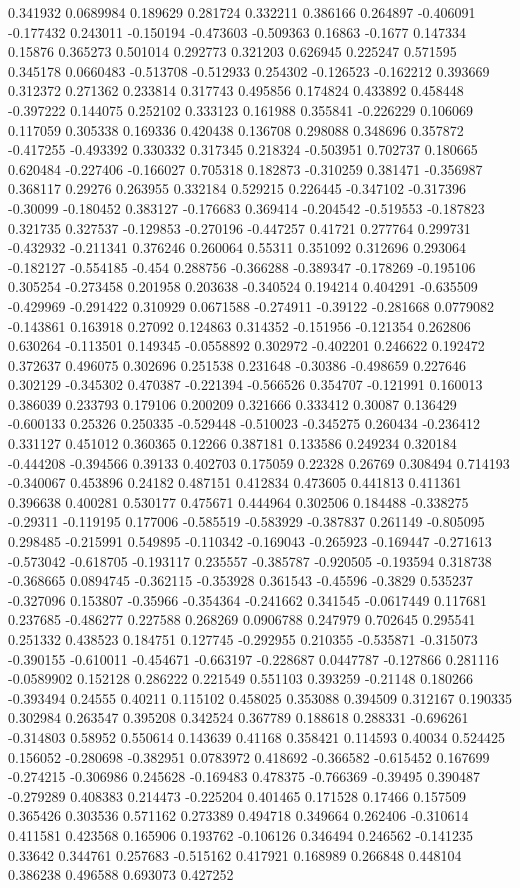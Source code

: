 0.341932 0.0689984 0.189629 0.281724 0.332211 0.386166 0.264897 -0.406091 -0.177432 0.243011 -0.150194 -0.473603 -0.509363 0.16863 -0.1677 0.147334 0.15876 0.365273 0.501014 0.292773 0.321203 0.626945 0.225247 0.571595 0.345178 0.0660483 -0.513708 -0.512933 0.254302 -0.126523 -0.162212 0.393669 0.312372 0.271362 0.233814 0.317743 0.495856 0.174824 0.433892 0.458448 -0.397222 0.144075 0.252102 0.333123 0.161988 0.355841 -0.226229 0.106069 0.117059 0.305338 0.169336 0.420438 0.136708 0.298088 0.348696 0.357872 -0.417255 -0.493392 0.330332 0.317345 0.218324 -0.503951 0.702737 0.180665 0.620484 -0.227406 -0.166027 0.705318 0.182873 -0.310259 0.381471 -0.356987 0.368117 0.29276 0.263955 0.332184 0.529215 0.226445 -0.347102 -0.317396 -0.30099 -0.180452 0.383127 -0.176683 0.369414 -0.204542 -0.519553 -0.187823 0.321735 0.327537 -0.129853 -0.270196 -0.447257 0.41721 0.277764 0.299731 -0.432932 -0.211341 0.376246 0.260064 0.55311 0.351092 0.312696 0.293064 -0.182127 -0.554185 -0.454 0.288756 -0.366288 -0.389347 -0.178269 -0.195106 0.305254 -0.273458 0.201958 0.203638 -0.340524 0.194214 0.404291 -0.635509 -0.429969 -0.291422 0.310929 0.0671588 -0.274911 -0.39122 -0.281668 0.0779082 -0.143861 0.163918 0.27092 0.124863 0.314352 -0.151956 -0.121354 0.262806 0.630264 -0.113501 0.149345 -0.0558892 0.302972 -0.402201 0.246622 0.192472 0.372637 0.496075 0.302696 0.251538 0.231648 -0.30386 -0.498659 0.227646 0.302129 -0.345302 0.470387 -0.221394 -0.566526 0.354707 -0.121991 0.160013 0.386039 0.233793 0.179106 0.200209 0.321666 0.333412 0.30087 0.136429 -0.600133 0.25326 0.250335 -0.529448 -0.510023 -0.345275 0.260434 -0.236412 0.331127 0.451012 0.360365 0.12266 0.387181 0.133586 0.249234 0.320184 -0.444208 -0.394566 0.39133 0.402703 0.175059 0.22328 0.26769 0.308494 0.714193 -0.340067 0.453896 0.24182 0.487151 0.412834 0.473605 0.441813 0.411361 0.396638 0.400281 0.530177 0.475671 0.444964 0.302506 0.184488 -0.338275 -0.29311 -0.119195 0.177006 -0.585519 -0.583929 -0.387837 0.261149 -0.805095 0.298485 -0.215991 0.549895 -0.110342 -0.169043 -0.265923 -0.169447 -0.271613 -0.573042 -0.618705 -0.193117 0.235557 -0.385787 -0.920505 -0.193594 0.318738 -0.368665 0.0894745 -0.362115 -0.353928 0.361543 -0.45596 -0.3829 0.535237 -0.327096 0.153807 -0.35966 -0.354364 -0.241662 0.341545 -0.0617449 0.117681 0.237685 -0.486277 0.227588 0.268269 0.0906788 0.247979 0.702645 0.295541 0.251332 0.438523 0.184751 0.127745 -0.292955 0.210355 -0.535871 -0.315073 -0.390155 -0.610011 -0.454671 -0.663197 -0.228687 0.0447787 -0.127866 0.281116 -0.0589902 0.152128 0.286222 0.221549 0.551103 0.393259 -0.21148 0.180266 -0.393494 0.24555 0.40211 0.115102 0.458025 0.353088 0.394509 0.312167 0.190335 0.302984 0.263547 0.395208 0.342524 0.367789 0.188618 0.288331 -0.696261 -0.314803 0.58952 0.550614 0.143639 0.41168 0.358421 0.114593 0.40034 0.524425 0.156052 -0.280698 -0.382951 0.0783972 0.418692 -0.366582 -0.615452 0.167699 -0.274215 -0.306986 0.245628 -0.169483 0.478375 -0.766369 -0.39495 0.390487 -0.279289 0.408383 0.214473 -0.225204 0.401465 0.171528 0.17466 0.157509 0.365426 0.303536 0.571162 0.273389 0.494718 0.349664 0.262406 -0.310614 0.411581 0.423568 0.165906 0.193762 -0.106126 0.346494 0.246562 -0.141235 0.33642 0.344761 0.257683 -0.515162 0.417921 0.168989 0.266848 0.448104 0.386238 0.496588 0.693073 0.427252 